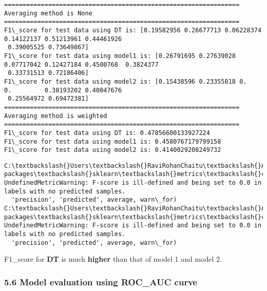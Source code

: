 \documentclass[11pt]{article}
\begin{document}
    \begin{Verbatim}[commandchars=\\\{\}]
================================================================
Averaging method is None
================================================================
F1\_score for test data using DT is: [0.19582956 0.26677713 0.06228374 0.14122137 0.51213961 0.44461926
 0.39005525 0.73649867]
F1\_score for test data using model1 is: [0.26791695 0.27639028 0.07717042 0.12427184 0.4500768  0.3824377
 0.33731513 0.72186406]
F1\_score for test data using model2 is: [0.15438596 0.23355818 0.         0.         0.38193202 0.40047676
 0.25564972 0.69472381]
================================================================
Averaging method is weighted
================================================================
F1\_score for test data using DT is: 0.47856600133927224
F1\_score for test data using model1 is: 0.4580767179799158
F1\_score for test data using model2 is: 0.4140029208249732

    \end{Verbatim}

    \begin{Verbatim}[commandchars=\\\{\}]
C:\textbackslash{}Users\textbackslash{}RaviRohanChaitu\textbackslash{}Anaconda3\textbackslash{}lib\textbackslash{}site-packages\textbackslash{}sklearn\textbackslash{}metrics\textbackslash{}classification.py:1135: UndefinedMetricWarning: F-score is ill-defined and being set to 0.0 in labels with no predicted samples.
  'precision', 'predicted', average, warn\_for)
C:\textbackslash{}Users\textbackslash{}RaviRohanChaitu\textbackslash{}Anaconda3\textbackslash{}lib\textbackslash{}site-packages\textbackslash{}sklearn\textbackslash{}metrics\textbackslash{}classification.py:1135: UndefinedMetricWarning: F-score is ill-defined and being set to 0.0 in labels with no predicted samples.
  'precision', 'predicted', average, warn\_for)

    \end{Verbatim}

    F1\_score for \textbf{DT} is much \textbf{higher} than that of model 1
and model 2.

    

    \subsubsection{5.6 Model evaluation using ROC\_AUC
curve}\label{model-evaluation-using-roc_auc-curve}
\end{document}
